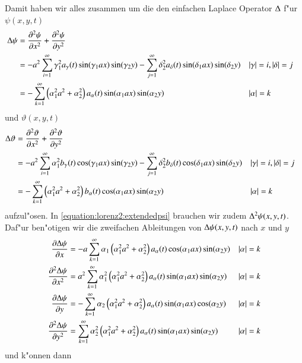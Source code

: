 \begin{refsection}
Damit haben wir alles zusammen um die den einfachen Laplace Operator $\laplace$ 
f"ur $\psi(x,y,t)$
\begin{align*}
\laplace\psi
&= 
\frac{\partial^2\psi}{\partial x^2}
+
\frac{\partial^2\psi}{\partial y^2}
\\
&=
-
a^2
\sum_{i = 1}^{\infty}
\gamma_1^2
a_{\gamma}(t)
\sin(\gamma_1 ax) \sin(\gamma_2 y)
-
\sum_{j = 1}^{\infty}
\delta_2^2
a_{\delta}(t) 
\sin(\delta_1 ax) \sin(\delta_2 y)
&&|\gamma| = i, |\delta| = j
\\
&=
-
\sum_{k = 1}^{\infty}
\left(\alpha_1^2 a^2 + \alpha_2^2 \right)
a_{\alpha}(t)
\sin(\alpha_1 ax) \sin(\alpha_2 y)
&&|\alpha| = k
\end{align*}
und $\vartheta(x,y,t)$
\begin{align*}
\laplace\vartheta &= 
\frac{\partial^2\vartheta}{\partial x^2}
+
\frac{\partial^2\vartheta}{\partial y^2} \\
&=
-
a^2
\sum_{i = 1}^{\infty}
\alpha_1^2
b_{\gamma}(t)
\cos(\gamma_1 ax) \sin(\gamma_2 y)
-
\sum_{j = 1}^{\infty}
\delta_2^2
b_{\delta}(t)
\cos(\delta_1 ax) \sin(\delta_2 y)
&&|\gamma| = i, |\delta| = j
\\
&=
-
\sum_{k = 1}^{\infty}
\left(\alpha_1^2 a^2 + \alpha_2^2\right)
b_{\alpha}(t)
\cos(\alpha_1 ax) \sin(\alpha_2 y)
&&|\alpha| = k
\end{align*}
aufzul"osen. In \cref{equation:lorenz2:extendedpsi} brauchen wir zudem 
$\laplace^2\psi(x,y,t)$. Daf"ur ben"otigen wir die zweifachen Ableitungen von 
$\laplace\psi(x,y,t)$ nach $x$ und $y$
\begin{align*}
\frac{\partial\laplace\psi}{\partial x} &=
-
a
\sum_{k = 1}^{\infty}
\alpha_1
\left(\alpha_1^2 a^2 + \alpha_2^2 \right)
a_{\alpha}(t)
\cos(\alpha_1 ax) \sin(\alpha_2 y)
&&|\alpha| = k
\\
\frac{\partial^2\laplace\psi}{\partial x^2}
&=
a^2
\sum_{k = 1}^{\infty}
\alpha_1^2
\left(\alpha_1^2 a^2+\alpha_2^2\right)
a_{\alpha}(t)
\sin(\alpha_1 ax) \sin(\alpha_2 y)
&&|\alpha| = k
\\
\frac{\partial\laplace\psi}{\partial y}
&=
-
\sum_{k = 1}^{\infty}
\alpha_2
\left(\alpha_1^2 a^2 + \alpha_2^2 \right)
a_{\alpha}(t)
\sin(\alpha_1 ax) \cos(\alpha_2 y)
&&|\alpha| = k
\\
\frac{\partial^2\laplace\psi}{\partial y^2}
&=
\sum_{k = 1}^{\infty}
\alpha_2^2
\left(\alpha_1^2 a^2+\alpha_2^2\right)
a_{\alpha}(t)
\sin(\alpha_1 ax) \sin(\alpha_2 y)
&&|\alpha| = k
\end{align*}
und k"onnen dann
\begin{align*}

\end{align*}
\end{refsection}
